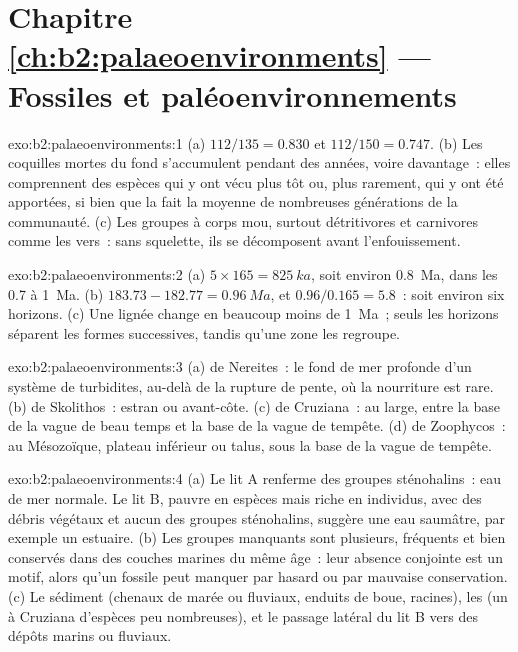 \section*{Chapitre \ref{ch:b2:palaeoenvironments} --- Fossiles et paléoenvironnements}

\begin{solution}{exo:b2:palaeoenvironments:1}
(a) $112/135 = 0.830$ et $112/150 = 0.747$. (b) Les coquilles mortes du fond s'accumulent pendant des années, voire
davantage~: elles comprennent des espèces qui y ont vécu plus tôt ou, plus rarement, qui y ont été apportées,
si bien que la  fait la moyenne de nombreuses générations de la communauté. (c) Les groupes à corps
mou, surtout détritivores et carnivores comme les vers~: sans squelette, ils se décomposent avant l'enfouissement.
\end{solution}

\begin{solution}{exo:b2:palaeoenvironments:2}
(a) $5 \times 165 = \qty{825}{ka}$, soit environ \qty{0.8}{Ma}, dans les 0.7
à 1~Ma. (b) $183.73 - 182.77 = \qty{0.96}{Ma}$, et $0.96/0.165 = 5.8$~: soit
environ six horizons. (c) Une lignée change en beaucoup moins de 1~Ma~; seuls
les horizons séparent les formes successives, tandis qu'une zone les regroupe.
\end{solution}

\begin{solution}{exo:b2:palaeoenvironments:3}
(a)  de Nereites~: le fond de mer profonde d'un système de turbidites, au-delà de la rupture
de pente, où la nourriture est rare. (b)  de Skolithos~: estran ou avant-côte. (c) 
de Cruziana~: au large, entre la base de la vague de beau temps et la base de la vague de tempête. (d)
 de Zoophycos~: au Mésozoïque, plateau inférieur ou talus, sous la base de la vague de tempête.
\end{solution}

\begin{solution}{exo:b2:palaeoenvironments:4}
(a) Le lit A renferme des groupes sténohalins~: eau de mer normale. Le lit B, pauvre en espèces
mais riche en individus, avec des débris végétaux et aucun des groupes sténohalins, suggère une
eau saumâtre, par exemple un estuaire. (b) Les groupes manquants sont plusieurs, fréquents et
bien conservés dans des couches marines du même âge~: leur absence conjointe est un motif, alors
qu'un fossile peut manquer par hasard ou par mauvaise conservation. (c) Le sédiment (chenaux
de marée ou fluviaux, enduits de boue, racines), les  (un  à Cruziana
d'espèces peu nombreuses), et le passage latéral du lit B vers des dépôts marins ou fluviaux.
\end{solution}


